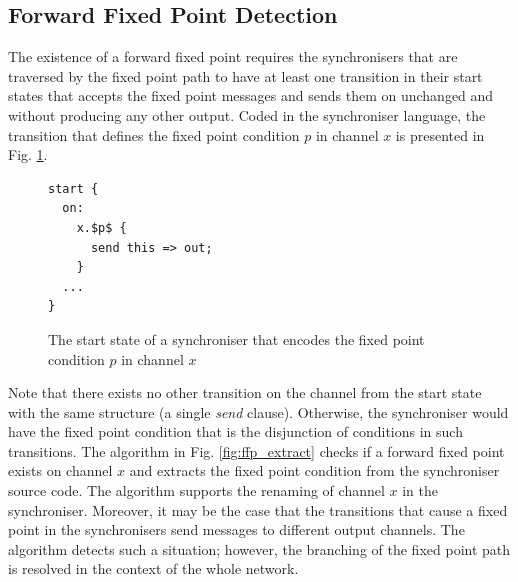     \subsection{Forward Fixed Point Detection}
The existence of a forward fixed point requires the synchronisers that are traversed by the fixed point path to have at least one transition in their start states that accepts the fixed point messages and sends them on unchanged and without producing any other output. Coded in the synchroniser language, the transition that defines the fixed point condition $p$ in channel $x$ is presented in Fig. \ref{ffp:synch_fp}.
\begin{figure}[h!]
\begin{lstlisting}[frame=single,mathescape]
start {
  on:
    x.$p$ {
      send this => out;
    }
  ...
}
\end{lstlisting}
\caption{The start state of a synchroniser that encodes the fixed point condition $p$ in channel $x$}
\label{ffp:synch_fp}
\end{figure}

Note that there exists no other transition on the channel from the start state with the same structure (a single \emph{send} clause). Otherwise, the synchroniser would have the fixed point condition that is the disjunction of conditions in such transitions. The algorithm in Fig. \ref{fig:ffp_extract} checks if a forward fixed point exists on channel $x$ and extracts the fixed point condition from the synchroniser source code. The algorithm supports the renaming of channel $x$ in the synchroniser. Moreover, it may be the case that the transitions that cause a fixed point in the synchronisers send messages to different output channels. The algorithm detects such a situation; however, the branching of the fixed point path is resolved in the context of the whole network.

